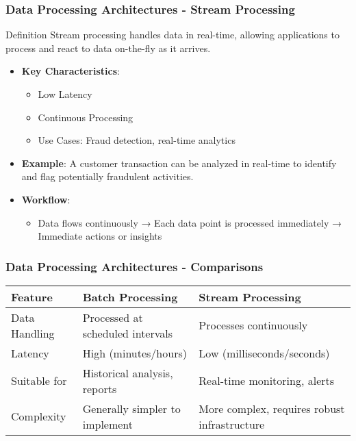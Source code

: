 \documentclass[aspectratio=169]{beamer}
\begin{document}
\begin{frame}[fragile]
    \frametitle{Data Processing Architectures - Stream Processing}
    
    \begin{block}{Definition}
        Stream processing handles data in real-time, allowing applications to process and react to data on-the-fly as it arrives.
    \end{block}
    
    \begin{itemize}
        \item \textbf{Key Characteristics}:
        \begin{itemize}
            \item Low Latency
            \item Continuous Processing
            \item Use Cases: Fraud detection, real-time analytics
        \end{itemize}
        
        \item \textbf{Example}: A customer transaction can be analyzed in real-time to identify and flag potentially fraudulent activities.
        
        \item \textbf{Workflow}:
        \begin{itemize}
            \item Data flows continuously → Each data point is processed immediately → Immediate actions or insights
        \end{itemize}
    \end{itemize}
\end{frame}

\begin{frame}[fragile]
    \frametitle{Data Processing Architectures - Comparisons}
    
    \begin{tabular}{|l|l|l|}
        \hline
        \textbf{Feature} & \textbf{Batch Processing} & \textbf{Stream Processing} \\
        \hline
        Data Handling         & Processed at scheduled intervals & Processes continuously \\
        \hline
        Latency               & High (minutes/hours)           & Low (milliseconds/seconds) \\
        \hline
        Suitable for          & Historical analysis, reports    & Real-time monitoring, alerts \\
        \hline
        Complexity            & Generally simpler to implement  & More complex, requires robust infrastructure \\
        \hline
    \end{tabular}
\end{frame}
\end{document}
